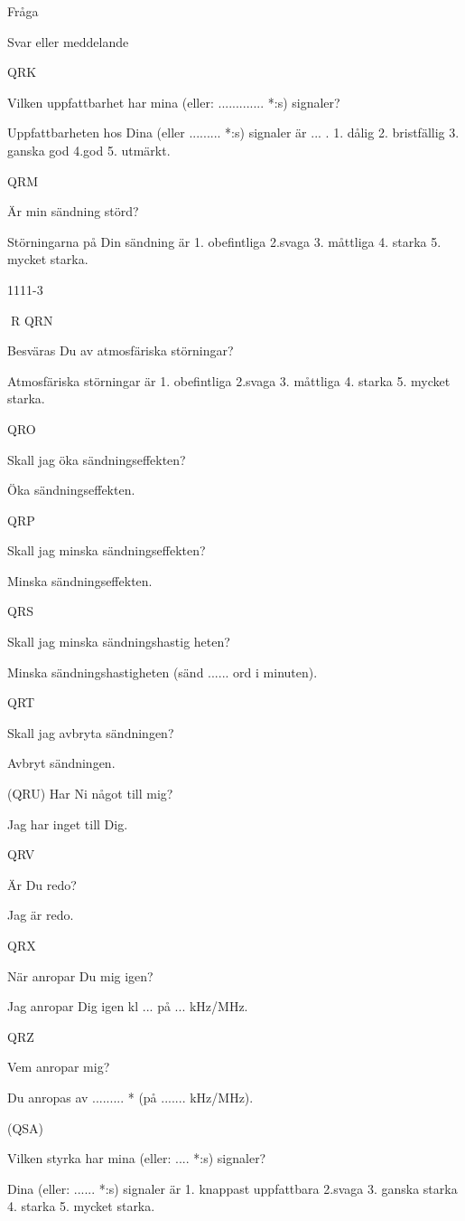 Fråga

Svar eller meddelande

QRK

Vilken uppfattbarhet har mina
(eller: ............. *:s) signaler?

Uppfattbarheten hos Dina
(eller ......... *:s) signaler är ... .
1. dålig
2. bristfällig
3. ganska god
4.god
5. utmärkt.

QRM

Är min sändning störd?

Störningarna på Din sändning är
1. obefintliga
2.svaga
3. måttliga
4. starka
5. mycket starka.

1111-3

R
QRN

Besväras Du av atmosfäriska
störningar?

Atmosfäriska störningar är
1. obefintliga
2.svaga
3. måttliga
4. starka
5. mycket starka.

QRO

Skall jag öka sändningseffekten?

Öka sändningseffekten.

QRP

Skall jag minska sändningseffekten?

Minska sändningseffekten.

QRS

Skall jag minska sändningshastig heten?

Minska sändningshastigheten
(sänd ...... ord i minuten).

QRT

Skall jag avbryta sändningen?

Avbryt sändningen.

(QRU) Har Ni något till mig?

Jag har inget till Dig.

QRV

Är Du redo?

Jag är redo.

QRX

När anropar Du mig igen?

Jag anropar Dig igen kl ... på ... kHz/MHz.

QRZ

Vem anropar mig?

Du anropas av ......... * (på ....... kHz/MHz).

(QSA)

Vilken styrka har mina
(eller: .... *:s) signaler?

Dina (eller: ...... *:s) signaler är
1. knappast uppfattbara
2.svaga
3. ganska starka
4. starka
5. mycket starka.

